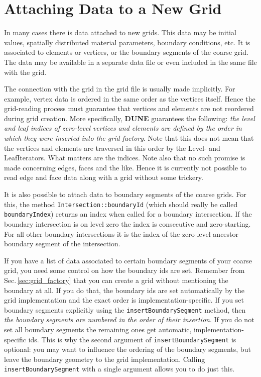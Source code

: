 \documentclass[11pt,a4paper,headinclude,footinclude,DIV16,normalheadings]{scrreprt}
\newcommand{\Dune}{{\sf\bfseries DUNE}\xspace}
\begin{document}
\section{Attaching Data to a New Grid}
\label{sec:import_data_for_new_grids}

In many cases there is data attached to new grids.  This data may be initial
values, spatially distributed material parameters, boundary conditions, etc.
It is associated to elements or vertices, or the boundary segments of the
coarse grid.  The data may be available in a separate data file or even
included in the same file with the grid. 

 The connection with the grid in
the grid file is usually made implicitly.  For example, vertex data is ordered
in the same order as the vertices itself.  Hence the grid-reading process must 
guarantee that vertices and elements are not reordered during grid creation.
More specifically, \Dune guarantees the following: {\em the level and leaf
indices of zero-level vertices and elements are defined by the order in which they
were inserted into the grid factory}.  Note that this does not mean that
the vertices and elements are traversed in this order by the Level- and
LeafIterators.  What matters are the indices.  Note also that no such
promise is made concerning edges, faces and the like.  Hence it is currently
not possible to read edge and face data along with a grid without some
trickery.

It is also possible to attach data to boundary segments of the coarse grids.
For this, the method \lstinline!Intersection::boundaryId! (which should
really be called \lstinline!boundaryIndex!) returns an index when called
for a boundary intersection.  If the boundary intersection is on level zero
the index is consecutive and zero-starting.  For all other boundary intersections
it is the index of the zero-level ancestor boundary segment of the intersection.

If you have a list of data associated to certain boundary segments of your
coarse grid, you need some control on how the boundary ids are set.  Remember
from Sec.\,\ref{sec:grid_factory} that you can create a grid without mentioning
the boundary at all.  If you do that, the boundary ids are set automatically
by the grid implementation and the exact order is implementation-specific.
If you set boundary segments explicitly using the \lstinline!insertBoundarySegment!
method, then {\em the boundary segments are numbered in the order of their
insertion}.  If you do not set all boundary segments the remaining ones
get automatic, implementation-specific ids.  This is why the second argument
of \lstinline!insertBoundarySegment! is optional: you may want to
influence the ordering of the boundary segments, but leave the boundary
geometry to the grid implementation.  Calling \lstinline!insertBoundarySegment!
with a single argument allows you to do just this.
\end{document}
